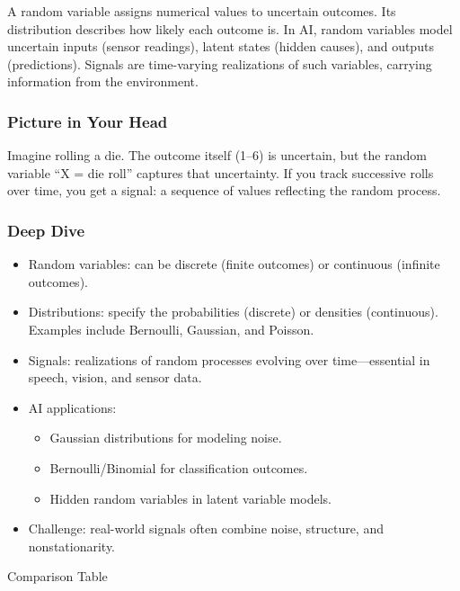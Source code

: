 \documentclass[
  letterpaper,
  DIV=11,
  numbers=noendperiod]{scrreprt}
\providecommand{\tightlist}{%
  \setlength{\itemsep}{0pt}\setlength{\parskip}{0pt}}
\begin{document}
A random variable assigns numerical values to uncertain outcomes. Its
distribution describes how likely each outcome is. In AI, random
variables model uncertain inputs (sensor readings), latent states
(hidden causes), and outputs (predictions). Signals are time-varying
realizations of such variables, carrying information from the
environment.

\subsubsection{Picture in Your Head}\label{picture-in-your-head-22}

Imagine rolling a die. The outcome itself (1--6) is uncertain, but the
random variable ``X = die roll'' captures that uncertainty. If you track
successive rolls over time, you get a signal: a sequence of values
reflecting the random process.

\subsubsection{Deep Dive}\label{deep-dive-22}

\begin{itemize}
\item
  Random variables: can be discrete (finite outcomes) or continuous
  (infinite outcomes).
\item
  Distributions: specify the probabilities (discrete) or densities
  (continuous). Examples include Bernoulli, Gaussian, and Poisson.
\item
  Signals: realizations of random processes evolving over
  time---essential in speech, vision, and sensor data.
\item
  AI applications:

  \begin{itemize}
  \tightlist
  \item
    Gaussian distributions for modeling noise.
  \item
    Bernoulli/Binomial for classification outcomes.
  \item
    Hidden random variables in latent variable models.
  \end{itemize}
\item
  Challenge: real-world signals often combine noise, structure, and
  nonstationarity.
\end{itemize}

Comparison Table
\end{document}
